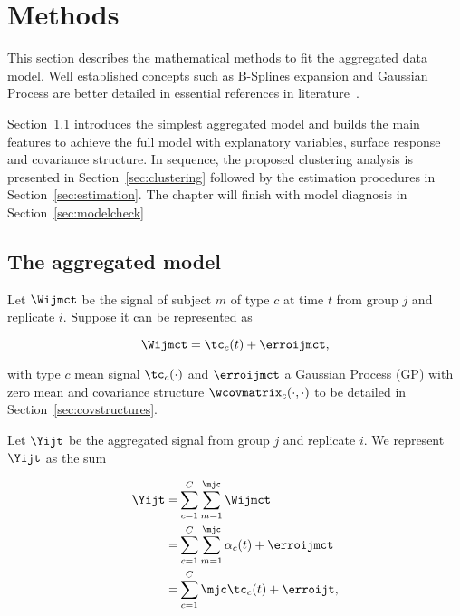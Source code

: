 


\chapter{Methods}
\label{chap:methods}

This section describes the mathematical methods to fit the aggregated data model. Well established concepts such as B-Splines expansion and Gaussian Process are better detailed in essential references in literature~\cite{shi2011gaussian,ramsay2005functional}.

Section~\ref{sec:aggrmodel} introduces the simplest aggregated model and builds the main features to achieve the full model with explanatory variables, surface response and covariance structure.
In sequence, the proposed clustering analysis is presented in Section~\ref{sec:clustering} followed by the estimation procedures in Section~\ref{sec:estimation}. The chapter will finish with model diagnosis in Section~\ref{sec:modelcheck}


\section{The aggregated model} \label{sec:aggrmodel}

Let $\Wijmct$ be the signal of subject $m$ of type $c$ at time $t$ from group $j$ and replicate $i$. Suppose it can be represented as

\begin{equation}
  \Wijmct = \tc_c(t) + \erroijmct,
  \label{eq:wmodel}
\end{equation}

\noindent with type $c$ mean signal $\tc_c(\cdot)$ and $\erroijmct$ a Gaussian Process (GP) with zero mean and covariance structure $\wcovmatrix_c(\cdot,\cdot)$ to be detailed in Section~\ref{sec:covstructures}.

Let $\Yijt$ be the aggregated signal from group $j$ and replicate $i$. We represent $\Yijt$ as the sum

\begin{align}
  \label{eq:yij}
  \Yijt
  =&
      \sum_{c=1}^C
      \sum_{m=1}^{\mjc}
      \Wijmct \\ \nonumber
  =&
      \sum_{c=1}^C
      \sum_{m=1}^{\mjc}
      \alpha_c(t)
      +
      \erroijmct \\ \nonumber
  =&
      \sum_{c=1}^C
      \mjc
       \tc_c(t)
      +
      \erroijt,
\end{align}

